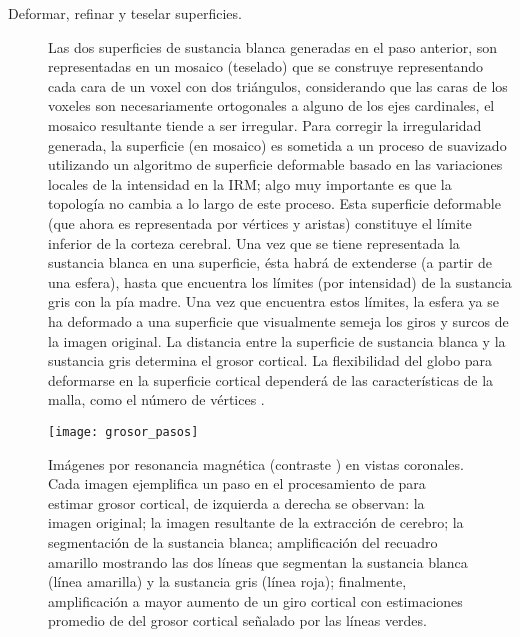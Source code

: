 \begin{description}
\item [Deformar, refinar y teselar superficies.] Las dos superficies de sustancia blanca generadas en el paso
anterior, son representadas en un mosaico (teselado) que se construye representando cada cara de un
voxel con dos triángulos, considerando que las caras de los voxeles son necesariamente ortogonales a
alguno de los ejes cardinales, el mosaico resultante tiende a ser irregular. Para corregir la irregularidad
generada, la superficie (en mosaico) es sometida a un proceso de suavizado utilizando un algoritmo de
superficie deformable basado en las variaciones locales de la intensidad en la IRM; algo muy
importante es que la topología no cambia a lo largo de este proceso. Esta superficie deformable (que
ahora es representada por vértices y aristas) constituye el límite inferior de la corteza cerebral. Una vez
que se tiene representada la sustancia blanca en una superficie, ésta habrá de extenderse (a partir de una
esfera), hasta que encuentra los límites (por intensidad) de la sustancia gris con la pía madre. Una vez que
encuentra estos límites, la esfera ya se ha deformado a una superficie que visualmente semeja los giros
y surcos de la imagen original. La distancia entre la superficie de sustancia blanca y la sustancia gris
determina el grosor cortical. La flexibilidad del globo para deformarse en la superficie cortical
dependerá de las características de la malla, como el número de vértices \cite{Dale1999}.
\end{description}


\begin{figure}[htb]
\begin{figg}
   \texttt{[image: grosor\_pasos]}
   \caption{Imágenes por resonancia magnética (contraste \Tone) en vistas coronales. Cada imagen ejemplifica un paso en el procesamiento de para estimar grosor cortical, de izquierda a derecha se observan: la imagen original; la imagen resultante de la extracción de cerebro; la segmentación de la sustancia blanca; amplificación del recuadro amarillo mostrando las dos líneas que segmentan la sustancia blanca (línea amarilla) y la sustancia gris (línea roja); finalmente, amplificación a mayor aumento de un giro cortical con estimaciones promedio de del grosor cortical señalado por las líneas verdes.
}
 \label{fig:grosor_pasos}
 \end{figg}
\end{figure}





